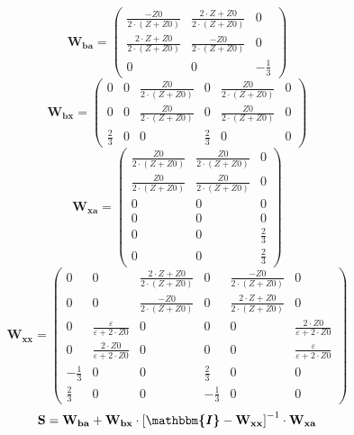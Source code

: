 \[ \mathbf{W_{ba}} = \left(\begin{array}{ccc} \frac{-Z0}{2\cdot
\left(Z+Z0\right)} & \frac{2\cdot Z+Z0}{2\cdot \left(Z+Z0\right)} & 0
\\ \frac{2\cdot Z+Z0}{2\cdot \left(Z+Z0\right)} & \frac{-Z0}{2\cdot
\left(Z+Z0\right)} & 0 \\ 0 & 0 & -\frac{1}{3} \end{array}\right) \]
\[ \mathbf{W_{bx}} = \left(\begin{array}{cccccc} 0 & 0 &
\frac{Z0}{2\cdot \left(Z+Z0\right)} & 0 & \frac{Z0}{2\cdot
\left(Z+Z0\right)} & 0 \\ 0 & 0 & \frac{Z0}{2\cdot \left(Z+Z0\right)}
& 0 & \frac{Z0}{2\cdot \left(Z+Z0\right)} & 0 \\ \frac{2}{3} & 0 & 0 &
\frac{2}{3} & 0 & 0 \end{array}\right) \]
\[ \mathbf{W_{xa}} = \left(\begin{array}{ccc} \frac{Z0}{2\cdot
\left(Z+Z0\right)} & \frac{Z0}{2\cdot \left(Z+Z0\right)} & 0 \\
\frac{Z0}{2\cdot \left(Z+Z0\right)} & \frac{Z0}{2\cdot
\left(Z+Z0\right)} & 0 \\ 0 & 0 & 0 \\ 0 & 0 & 0 \\ 0 & 0 &
\frac{2}{3} \\ 0 & 0 & \frac{2}{3} \end{array}\right) \]
\[ \mathbf{W_{xx}} = \left(\begin{array}{cccccc} 0 & 0 & \frac{2\cdot
Z+Z0}{2\cdot \left(Z+Z0\right)} & 0 & \frac{-Z0}{2\cdot
\left(Z+Z0\right)} & 0 \\ 0 & 0 & \frac{-Z0}{2\cdot \left(Z+Z0\right)}
& 0 & \frac{2\cdot Z+Z0}{2\cdot \left(Z+Z0\right)} & 0 \\ 0 &
\frac{\varepsilon}{\varepsilon+2\cdot Z0} & 0 & 0 & 0 & \frac{2\cdot
Z0}{\varepsilon+2\cdot Z0} \\ 0 & \frac{2\cdot Z0}{\varepsilon+2\cdot
Z0} & 0 & 0 & 0 & \frac{\varepsilon}{\varepsilon+2\cdot Z0} \\
-\frac{1}{3} & 0 & 0 & \frac{2}{3} & 0 & 0 \\ \frac{2}{3} & 0 & 0 &
-\frac{1}{3} & 0 & 0 \end{array}\right) \]
\[ \mathbf{S}=\mathbf{W_{ba}}+\mathbf{W_{bx}}\cdot\left[
\boldsymbol{\mathbbm{I}}
-\mathbf{W_{xx}}\right]^{-1}\cdot\mathbf{W_{xa}} \]
